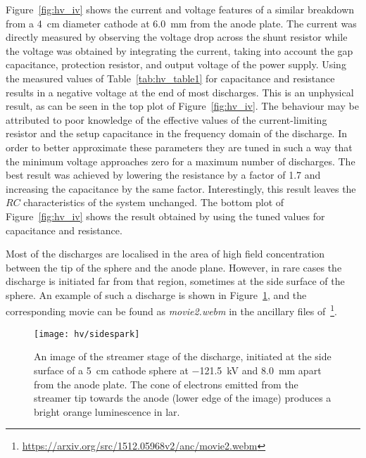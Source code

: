Figure~\ref{fig:hv_iv} shows the current and voltage features of a similar breakdown from a \SI{4}{\centi\metre} diameter cathode at \SI{6.0}{\milli\metre} from the anode plate.
The current was directly measured by observing the voltage drop across the shunt resistor while the voltage was obtained by integrating the current, taking into account the gap capacitance, protection resistor, and output voltage of the power supply.
Using the measured values of Table~\ref{tab:hv_table1} for capacitance and resistance results in a negative voltage at the end of most discharges.
This is an unphysical result, as can be seen in the top plot of Figure~\ref{fig:hv_iv}.
The behaviour may be attributed to poor knowledge of the effective values of the current-limiting resistor and the setup capacitance in the frequency domain of the discharge.
In order to better approximate these parameters they are tuned in such a way that the minimum voltage approaches zero for a maximum number of discharges.
The best result was achieved by lowering the resistance by a factor of \num{1.7} and increasing the capacitance by the same factor.
Interestingly, this result leaves the $RC$ characteristics of the system unchanged.
The bottom plot of Figure~\ref{fig:hv_iv} shows the result obtained by using the tuned values for capacitance and resistance.

Most of the discharges are localised in the area of high field concentration between the tip of the sphere and the anode plane.
However, in rare cases the discharge is initiated far from that region, sometimes at the side surface of the sphere.
An example of such a discharge is shown in Figure~\ref{fig:hv_side}, and the corresponding movie can be found as \emph{movie2.webm} in the ancillary files of~\cite{breakdown_16}\footnote{\url{https://arxiv.org/src/1512.05968v2/anc/movie2.webm}}.

\begin{figure}[tbp]
	\centering	
	\texttt{[image: hv/sidespark]}
	\caption[ test streamer image]{%
		An image of the streamer stage of the discharge, initiated at the side surface of a \SI{5}{\centi\metre} cathode sphere at \SI{-121.5}{\kilo\volt} and \SI{8.0}{\milli\metre} apart from the anode plate.
		The cone of electrons emitted from the streamer tip towards the anode (lower edge of the image) produces a bright orange luminescence in \acrshort{lar}.
	}
	\label{fig:hv_side}
\end{figure}

